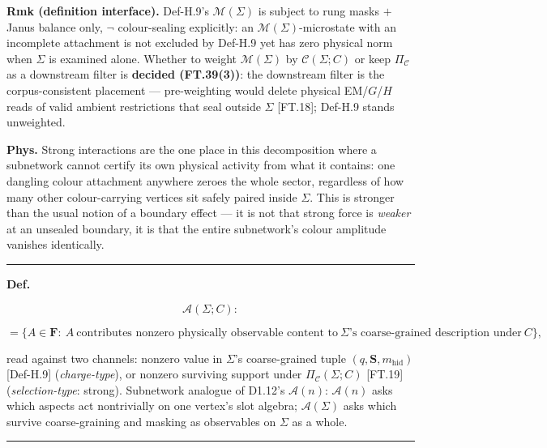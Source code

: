 \begin{theorem}
\textbf{Rmk (definition interface).} Def-H.9's $\mathcal M(\Sigma)$ is subject to rung masks $+$ Janus balance only, $\neg$ colour-sealing explicitly: an $\mathcal M(\Sigma)$-microstate with an incomplete attachment is not excluded by Def-H.9 yet has zero physical norm when $\Sigma$ is examined alone. Whether to weight $\mathcal M(\Sigma)$ by $\mathcal C(\Sigma;C)$ or keep $\Pi_{\mathcal C}$ as a downstream filter is \textbf{decided (FT.39(3))}: the downstream filter is the corpus-consistent placement — pre-weighting would delete physical EM/$G$/$H$ reads of valid ambient restrictions that seal outside $\Sigma$ [FT.18]; Def-H.9 stands unweighted.

\textbf{Phys.} Strong interactions are the one place in this decomposition where a subnetwork cannot certify its own physical activity from what it contains: one dangling colour attachment anywhere zeroes the whole sector, regardless of how many other colour-carrying vertices sit safely paired inside $\Sigma$. This is stronger than the usual notion of a boundary effect — it is not that strong force is \textit{weaker} at an unsealed boundary, it is that the entire subnetwork's colour amplitude vanishes identically.

\vspace{2pt}\noindent\rule{\textwidth}{0.4pt}\vspace{2pt}

\end{theorem}

\begin{definition}\label{tag:Def-H-11}
\textbf{Def.}

\[
\mathcal A(\Sigma;C):
\]

\[
= \bigl\{A\in\mathbf F:\ A\ \text{contributes nonzero physically observable content to}\ \Sigma\text{'s coarse-grained description under}\ C\bigr\},
\]

read against two channels: nonzero value in $\Sigma$'s coarse-grained tuple $(q,\mathbf S,m_{\mathrm{hid}})$ [Def-H.9] (\textit{charge-type}), or nonzero surviving support under $\Pi_{\mathcal C}(\Sigma;C)$ [FT.19] (\textit{selection-type}: strong). Subnetwork analogue of D1.12's $\mathcal A(n)$: $\mathcal A(n)$ asks which aspects act nontrivially on one vertex's slot algebra; $\mathcal A(\Sigma)$ asks which survive coarse-graining and masking as observables on $\Sigma$ as a whole.

\vspace{2pt}\noindent\rule{\textwidth}{0.4pt}\vspace{2pt}

\end{definition}

